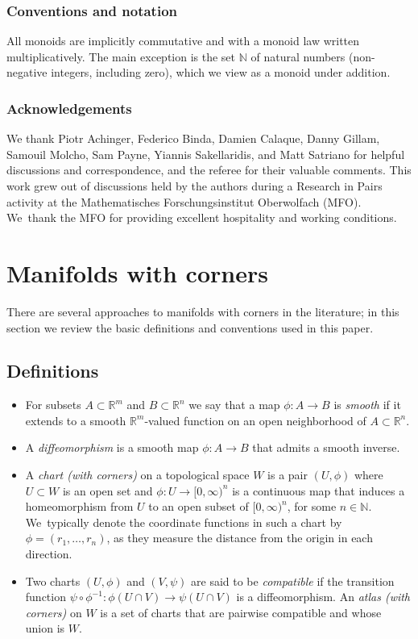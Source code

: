 \documentclass[10pt]{amsart}
\theoremstyle{definition}
\theoremstyle{remark}
\let\defn\emph
\newcommand{\RR}{\mathbb{R}}
\newcommand{\NN}{\mathbb{N}}
\newcommand{\halfspc}[1]{[0,\infty)^{#1}}
\let\Subsection\subsection\let\Subsubsection\subsubsection
\begin{document}
\subsubsection*{Conventions and notation}

All monoids are implicitly commutative and with a monoid law written multiplicatively. The main exception is the set $\NN$ of natural numbers (\ie non-negative integers, including zero), which we view as a monoid under addition.\enlargethispage{.5\baselineskip}

\subsubsection*{Acknowledgements} We thank Piotr Achinger, Federico Binda, Damien Calaque, Danny Gillam, Samouil Molcho, Sam Payne, Yiannis Sakellaridis, and Matt \hbox{Satriano} for helpful discussions and correspondence, and the referee for their valuable comments. This work grew out of discussions held by the authors during a Research in Pairs activity at the Mathematisches Forschungsinstitut Oberwolfach (MFO). We~thank the MFO for providing excellent hospitality and working conditions.

\section{Manifolds with corners}
There are several approaches to manifolds with corners in the literature; in this section we review the basic definitions and conventions used in this paper.

\Subsection{Definitions}

\begin{itemize}
\item
For subsets $A\subset \RR^m$ and $B\subset \RR^n$ we say that a map $\phi\colon A\to B$ is \defn{smooth} if it extends to a smooth $\RR^m$-valued function on an open neighborhood of $A\subset \RR^n$.

\item
A \defn{diffeomorphism} is a smooth map $\phi\colon A\to B$ that admits a smooth inverse.

\item
A \defn{chart (with corners)} on a topological space $W$ is a pair $(U,\phi)$ where $U\subset W$ is an open set and $\phi\colon U\to \halfspc{n}$ is a continuous map that induces a homeomorphism from $U$ to an open subset of $\halfspc{n}$, for some $n\in\NN$. We~typically denote the coordinate functions in such a chart by $\phi=(r_1,\ldots,r_n)$, as they measure the distance from the origin in each direction.

\item
Two charts $(U,\phi)$ and $(V,\psi)$ are said to be \defn{compatible} if the transition function $\psi\circ \phi^{-1}\colon \phi(U\cap V)\to \psi(U\cap V)$ is a diffeomorphism. An \defn{atlas (with corners)} on $W$ is a set of charts that are pairwise compatible and whose union is $W$.
\end{itemize}
\end{document}
